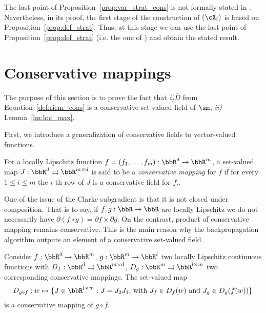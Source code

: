 \begin{remark}
  The last point of Proposition~\ref{prop:var_strat_cons} is not formally stated in \cite[Theorem 4]{bolte2021conservative}. Nevertheless, in its proof, the first stage of the construction of $(\cX_i)$ is based on Proposition~\ref{prop:def_strat}. Thus, at this stage we can use the last point of Proposition~\ref{prop:def_strat} (i.e. the one of \cite[4.8]{van1998tame}) and obtain the stated result.
\end{remark}


\section{Conservative mappings}\label{app:conserv}

The purpose of this section is to prove the fact that \emph{i)}$\bar{D}$ from Equation~\eqref{def:riem_cons} is a conservative set-valued field of $\sm$, \emph{ii)} Lemma~\ref{lm:loc_max}.


First, we introduce a generalization of conservative fields to vector-valued functions.

\begin{definition}\label{def:cons_map}
  For a locally Lipschitz function $f = (f_1, \ldots, f_m): \bbR^d \rightarrow \bbR^m$, a set-valued map $J: \bbR^d \rightrightarrows \bbR^{m \times d}$ is said to be a \emph{conservative mapping} for $f$ if for every $ 1\leq i \leq m$ the $i$-th row of $J$ is a conservative field for $f_i$. 
\end{definition}


One of the issue of the Clarke subgradient is that it is not closed under composition. That is to say, if $f, g : \bbR \rightarrow \bbR$ are locally Lipschitz we do not necessarily have $\partial (f\circ g) = \partial f \times \partial g$. On the contrast, product of conservative mapping remains conservative. This is the main reason why the backpropagation algorithm outputs an element of a conservative set-valued field.
\begin{proposition}\label{pr:comp_cons}
  Consider $f : \bbR^d \rightarrow \bbR^m$, $g: \bbR^m \rightarrow \bbR^{l}$ two locally Lipschitz continuous functions with $D_f: \bbR^{d} \rightrightarrows \bbR^{m \times d}$, $D_g : \bbR^m \rightrightarrows \bbR^{l \times m}$ two corresponding conservative mappings. The set-valued map
  \begin{equation*}
    D_{g \circ f} : w \mapsto \{J \in \bbR^{l \times m} : \textrm{$J = J_2 J_1$, with $J_f \in D_f(w)$ and $J_g \in D_{g}(f(w))$}\}\, 
  \end{equation*} 
  is a conservative mapping of $g \circ f$.
\end{proposition}

